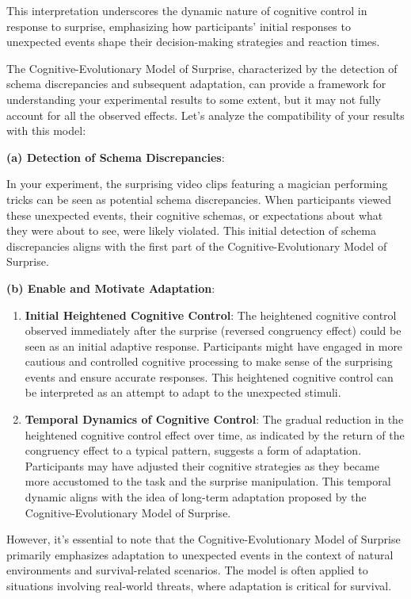 \documentclass[
  man]{apa7}
\begin{document}
This interpretation underscores the dynamic nature of cognitive control in response to surprise, emphasizing how participants' initial responses to unexpected events shape their decision-making strategies and reaction times.

\newpage

The Cognitive-Evolutionary Model of Surprise, characterized by the detection of schema discrepancies and subsequent adaptation, can provide a framework for understanding your experimental results to some extent, but it may not fully account for all the observed effects. Let's analyze the compatibility of your results with this model:

\textbf{(a) Detection of Schema Discrepancies}:

In your experiment, the surprising video clips featuring a magician performing tricks can be seen as potential schema discrepancies. When participants viewed these unexpected events, their cognitive schemas, or expectations about what they were about to see, were likely violated. This initial detection of schema discrepancies aligns with the first part of the Cognitive-Evolutionary Model of Surprise.

\textbf{(b) Enable and Motivate Adaptation}:

\begin{enumerate}
\def\labelenumi{\arabic{enumi}.}
\item
  \textbf{Initial Heightened Cognitive Control}: The heightened cognitive control observed immediately after the surprise (reversed congruency effect) could be seen as an initial adaptive response. Participants might have engaged in more cautious and controlled cognitive processing to make sense of the surprising events and ensure accurate responses. This heightened cognitive control can be interpreted as an attempt to adapt to the unexpected stimuli.
\item
  \textbf{Temporal Dynamics of Cognitive Control}: The gradual reduction in the heightened cognitive control effect over time, as indicated by the return of the congruency effect to a typical pattern, suggests a form of adaptation. Participants may have adjusted their cognitive strategies as they became more accustomed to the task and the surprise manipulation. This temporal dynamic aligns with the idea of long-term adaptation proposed by the Cognitive-Evolutionary Model of Surprise.
\end{enumerate}

However, it's essential to note that the Cognitive-Evolutionary Model of Surprise primarily emphasizes adaptation to unexpected events in the context of natural environments and survival-related scenarios. The model is often applied to situations involving real-world threats, where adaptation is critical for survival.
\end{document}
